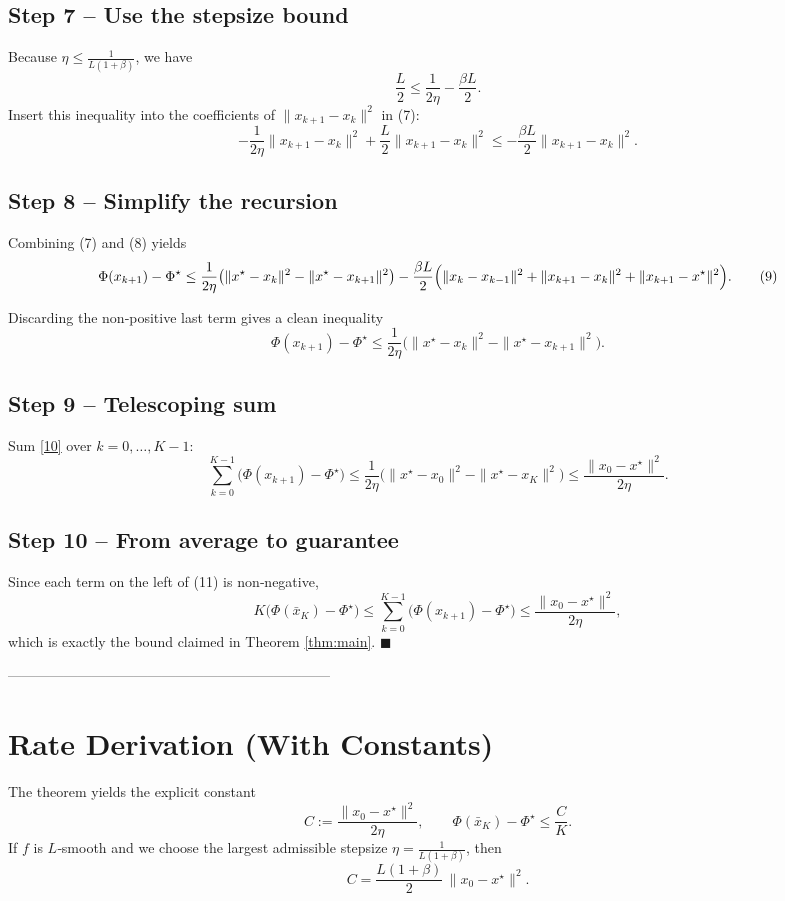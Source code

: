 \documentclass{article}
\begin{document}
\subsection*{Step 7 – Use the stepsize bound}
Because $\eta\le\frac{1}{L(1+\beta)}$, we have
\[
\frac{L}{2}\le\frac{1}{2\eta}-\frac{\beta L}{2}.
\]
Insert this inequality into the coefficients of $\|x_{k+1}-x_k\|^{2}$ in (7):
\[
-\frac{1}{2\eta}\|x_{k+1}-x_k\|^{2}+\frac{L}{2}\|x_{k+1}-x_k\|^{2}
\le -\frac{\beta L}{2}\|x_{k+1}-x_k\|^{2}. \tag{8}
\]

\subsection*{Step 8 – Simplify the recursion}
Combining (7) and (8) yields
\[
\Phi(x_{k+1})-\Phi^{\star}
\le
\frac{1}{2\eta}\bigl(\|x^{\star}-x_k\|^{2}
-\|x^{\star}-x_{k+1}\|^{2}\bigr)
-\frac{\beta L}{2}\Bigl(\|x_k-x_{k-1}\|^{2}
+\|x_{k+1}-x_k\|^{2}
+\|x_{k+1}-x^{\star}\|^{2}\Bigr). \tag{9}
\]

Discarding the non‑positive last term gives a clean inequality
\[
\Phi(x_{k+1})-\Phi^{\star}
\le
\frac{1}{2\eta}\bigl(\|x^{\star}-x_k\|^{2}
-\|x^{\star}-x_{k+1}\|^{2}\bigr). \tag{10}
\]

\subsection*{Step 9 – Telescoping sum}
Sum \eqref{10} over $k=0,\dots,K-1$:
\[
\sum_{k=0}^{K-1}\bigl(\Phi(x_{k+1})-\Phi^{\star}\bigr)
\le
\frac{1}{2\eta}\bigl(\|x^{\star}-x_0\|^{2}
-\|x^{\star}-x_{K}\|^{2}\bigr)
\le\frac{\|x_0-x^{\star}\|^{2}}{2\eta}. \tag{11}
\]

\subsection*{Step 10 – From average to guarantee}
Since each term on the left of (11) is non‑negative,
\[
K\bigl(\Phi(\bar{x}_{K})-\Phi^{\star}\bigr)
\le
\sum_{k=0}^{K-1}\bigl(\Phi(x_{k+1})-\Phi^{\star}\bigr)
\le\frac{\|x_0-x^{\star}\|^{2}}{2\eta},
\]
which is exactly the bound claimed in Theorem \ref{thm:main}. \hfill $\blacksquare$

---------------------------------------------------------------------

\section*{Rate Derivation (With Constants)}
The theorem yields the explicit constant
\[
C:=\frac{\|x_0-x^{\star}\|^{2}}{2\eta},
\qquad
\Phi(\bar{x}_{K})-\Phi^{\star}\le \frac{C}{K}.
\]
If $f$ is $L$‑smooth and we choose the largest admissible stepsize $\eta=\frac{1}{L(1+\beta)}$, then
\[
C = \frac{L(1+\beta)}{2}\,\|x_0-x^{\star}\|^{2}.
\]
\end{document}
